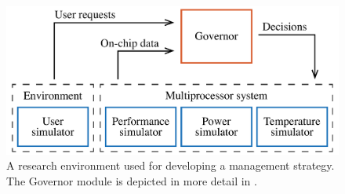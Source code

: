 \begin{figure}
  \centering
  \includegraphics[width=1.0\columnwidth]{include/assets/figures/developer.pdf}
  \caption{A research environment used for developing a management strategy. The
  Governor module is depicted in more detail in .}
\end{figure}
